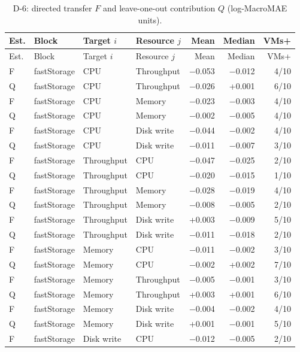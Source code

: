 \documentclass[a4paper,11pt]{article}
\begin{document}
\footnotesize
\setlength{\tabcolsep}{3pt}
\begin{longtable}{@{}llllrrr@{}}
\caption{D-6: directed transfer $F$ and leave-one-out contribution $Q$ (log-MacroMAE units).}\label{tab:supp-t2-d6}\\
\toprule
Est. & Block & Target $i$ & Resource $j$ & Mean & Median & VMs+ \\
\midrule
\endfirsthead
\toprule
Est. & Block & Target $i$ & Resource $j$ & Mean & Median & VMs+ \\
\midrule
\endhead
\bottomrule
\endfoot
F & fastStorage & CPU & Throughput & $-$0.053 & $-$0.012 & 4/10 \\
Q & fastStorage & CPU & Throughput & $-$0.026 & +0.001 & 6/10 \\
F & fastStorage & CPU & Memory & $-$0.023 & $-$0.003 & 4/10 \\
Q & fastStorage & CPU & Memory & $-$0.002 & $-$0.005 & 4/10 \\
F & fastStorage & CPU & Disk write & $-$0.044 & $-$0.002 & 4/10 \\
Q & fastStorage & CPU & Disk write & $-$0.011 & $-$0.007 & 3/10 \\
F & fastStorage & Throughput & CPU & $-$0.047 & $-$0.025 & 2/10 \\
Q & fastStorage & Throughput & CPU & $-$0.020 & $-$0.015 & 1/10 \\
F & fastStorage & Throughput & Memory & $-$0.028 & $-$0.019 & 4/10 \\
Q & fastStorage & Throughput & Memory & $-$0.008 & $-$0.005 & 2/10 \\
F & fastStorage & Throughput & Disk write & +0.003 & $-$0.009 & 5/10 \\
Q & fastStorage & Throughput & Disk write & $-$0.011 & $-$0.018 & 2/10 \\
F & fastStorage & Memory & CPU & $-$0.011 & $-$0.002 & 3/10 \\
Q & fastStorage & Memory & CPU & $-$0.002 & +0.002 & 7/10 \\
F & fastStorage & Memory & Throughput & $-$0.005 & $-$0.001 & 3/10 \\
Q & fastStorage & Memory & Throughput & +0.003 & +0.001 & 6/10 \\
F & fastStorage & Memory & Disk write & $-$0.004 & $-$0.002 & 4/10 \\
Q & fastStorage & Memory & Disk write & +0.001 & $-$0.001 & 5/10 \\
F & fastStorage & Disk write & CPU & $-$0.012 & $-$0.005 & 2/10 \\

\end{longtable}
\end{document}
